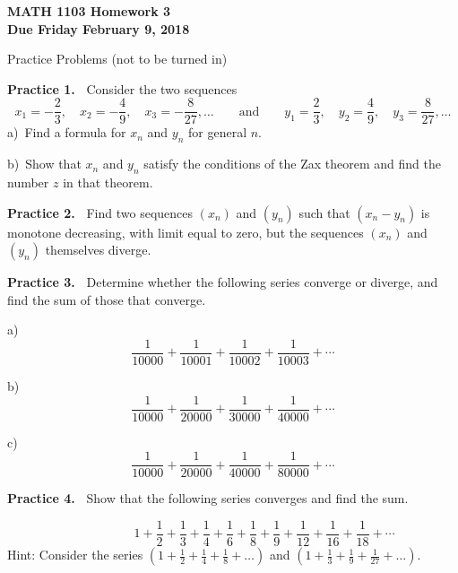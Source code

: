 \documentclass[12pt]{article}
\theoremstyle{definition}
\theoremstyle{remark}
\theoremstyle{definition}
\newenvironment{Solution}{\noindent\textbf{Solution.}}{}
\begin{document}
  

{\bf MATH 1103 Homework 3}\\
{\bf Due Friday February 9, 2018}


Practice Problems (not to be turned in)



{\bf Practice 1.\ }  Consider the two sequences 
\[x_1=-\frac{2}{3},\quad x_2=-\frac{4}{9}, \quad x_3=-\frac{8}{27},\dots\qquad\text{and}\qquad y_1=\frac{2}{3},\quad y_2=\frac{4}{9}, \quad y_3=\frac{8}{27},\dots\]
a)\ Find a formula for $x_n$ and $y_n$ for general $n$. 

b)\ Show that $x_n$ and $y_n$ satisfy the conditions of the Zax theorem and find the number $z$ in that theorem. 

{\bf Practice 2.\ }  Find two sequences $(x_n)$ and $(y_n)$ such that $(x_n-y_n)$ is monotone decreasing, with limit equal to zero, but the sequences $(x_n)$ and $(y_n)$ themselves diverge. 


\vskip5pt
{\bf Practice 3.\ } Determine whether the following series converge or diverge, and find the sum of those that converge.

a)\ 
\[\frac{1}{10000}+\frac{1}{10001}+\frac{1}{10002}+\frac{1}{10003}+\cdots\]


b)\ 
\[\frac{1}{10000}+\frac{1}{20000}+\frac{1}{30000}+\frac{1}{40000}+\cdots\]


c)\
\[\frac{1}{10000}+\frac{1}{20000}+\frac{1}{40000}+\frac{1}{80000}+\cdots\]






{\bf Practice 4.\ }   Show that the following series converges and find the sum.

\[\!\quad\qquad\qquad 1+\frac{1}{2}+\frac{1}{3}+\frac{1}{4}+\frac{1}{6}+\frac{1}{8}+\frac{1}{9}+\frac{1}{12}+\frac{1}{16}+\frac{1}{18}+\cdots
\]
Hint: Consider the series $(1+\frac{1}{2}+\frac{1}{4}+\frac{1}{8}+\dots)$ and $(1+\frac{1}{3}+\frac{1}{9}+\frac{1}{27}+\dots)$.

\end{document}
